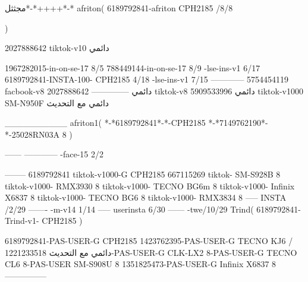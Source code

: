 مجثثل*-*++++*-*
afriton(
6189792841-afriton CPH2185  /8/8

)

2027888642 tiktok-v10
دائمي

1967282015-in-on-se-17 8/5
788449144-in-on-se-17 8/9
-lse-ins-v1 6/17
6189792841-INSTA-100- CPH2185 4/18
-lse-ins-v1 7/15
------------
5754454119 facbook-v8
دائمي
--------------
2027888642 tiktok-v8
دائمي
5909533996 tiktok-v1000  SM-N950F
دائمي مع التحديث

__________
afriton1(
*-*6189792841*-*-CPH2185
*-*7149762190*-*-25028RN03A  8
)


------
------------
-face-15 2/2

--------
6189792841 tiktok-v1000-G CPH2185 
667115269 tiktok- SM-S928B  8 tiktok-v1000- RMX3930  8 tiktok-v1000- TECNO BG6m  8 tiktok-v1000- Infinix X6837  8 tiktok-v1000- TECNO BG6  8 tiktok-v1000- RMX3834  8\9
-----
 INSTA /2/29
-------
-m-v14 1/14
-----
userinsta 6/30
------
-twe/10/29
Trind(
6189792841-Trind-v1- CPH2185 
)


6189792841-PAS-USER-G CPH2185 
1423762395-PAS-USER-G TECNO KJ6  /دائمي مع التحديث
1221233518-PAS-USER-G CLK-LX2 8-PAS-USER-G TECNO CL6 8-PAS-USER SM-S908U 8
1351825473-PAS-USER-G Infinix X6837 8
    ---------------
